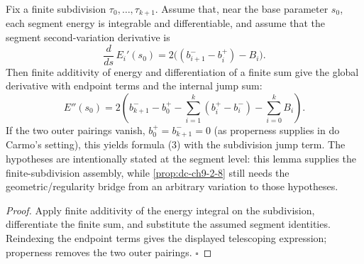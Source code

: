 \begin{lemma}
  \label{lem:dc-ch9-2-8-piecewise-assembly}


  Fix a finite subdivision $\tau_0,\ldots,\tau_{k+1}$. Assume that, near the base
  parameter $s_0$, each segment energy is integrable and differentiable, and assume that
  the segment second-variation derivative is
  $$
  \frac{d}{ds}\,E_i'(s_0)=2\big((b^-_{i+1}-b^+_i)-B_i\big).
  $$
  Then finite additivity of energy and differentiation of a finite sum give the global
  derivative with endpoint terms and the internal jump sum:
  $$
  E''(s_0)=2\left(b^-_{k+1}-b^+_0-
    \sum_{i=1}^{k}(b^+_i-b^-_i)-\sum_{i=0}^{k}B_i\right).
  $$
  If the two outer pairings vanish, $b^+_0=b^-_{k+1}=0$ (as properness supplies
  in do Carmo's setting), this yields formula (3) with the subdivision jump term.
  The hypotheses are intentionally stated at the segment level:
  this lemma supplies the finite-subdivision assembly, while \cref{prop:dc-ch9-2-8} still
  needs the geometric/regularity bridge from an arbitrary variation to those hypotheses.
\end{lemma}
\begin{proof}

  Apply finite additivity of the energy integral on the subdivision, differentiate the finite
  sum, and substitute the assumed segment identities. Reindexing the endpoint terms gives
  the displayed telescoping expression; properness removes the two outer pairings. $\square$
\end{proof}

